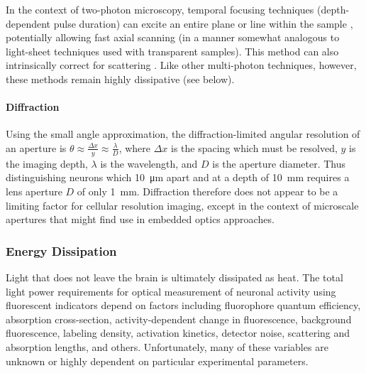 In the context of two-photon microscopy, temporal focusing techniques (depth-dependent pulse duration) can excite an entire plane or line within the sample \cite{oron2005scanningless, tal2005improved, sela2013ultra, packer2013targeting}, potentially allowing fast axial scanning (in a manner somewhat analogous to light-sheet techniques used with transparent samples). This method can also intrinsically correct for scattering \cite{papagiakoumou2013functional}. Like other multi-photon techniques, however, these methods remain highly dissipative (see below).

\paragraph{Diffraction}
Using the small angle approximation, the diffraction-limited angular resolution of an aperture is $\theta \approx \frac{\Delta x}{y} \approx \frac{\lambda}{D}$, where $\Delta x$ is the spacing which must be resolved, $y$ is the imaging depth, $\lambda$ is the wavelength, and $D$ is the aperture diameter. Thus distinguishing neurons which \SI{10}{\micro\meter} apart and at a depth of \SI{10}{\milli\meter} requires a lens aperture $D$ of only \SI{1}{\milli\meter}. Diffraction therefore does not appear to be a limiting factor for cellular resolution imaging, except in the context of microscale apertures that might find use in embedded optics approaches.

\subsubsection{Energy Dissipation}

Light that does not leave the brain is ultimately dissipated as heat.
The total light power requirements for optical measurement of neuronal activity using fluorescent indicators depend on factors including
fluorophore quantum efficiency,
absorption cross-section,
activity-dependent change in fluorescence,
background fluorescence,
labeling density,
activation kinetics,
detector noise,
scattering and absorption lengths,
and others. Unfortunately, many of these variables are unknown or highly dependent on particular experimental parameters.

